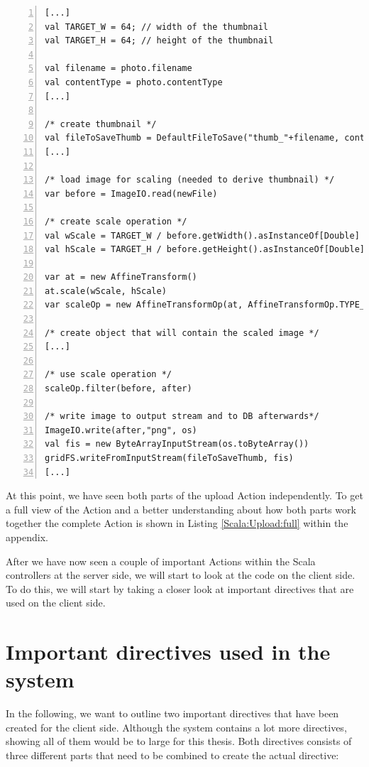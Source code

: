 \begin{lstlisting}[numbers=left,caption={Snippet of the upload Action of the FileController for creating thumbnails},label=Scala:Upload:Thumb,frame=tlbr,breaklines]
[...]
val TARGET_W = 64; // width of the thumbnail
val TARGET_H = 64; // height of the thumbnail

val filename = photo.filename
val contentType = photo.contentType
[...]

/* create thumbnail */
val fileToSaveThumb = DefaultFileToSave("thumb_"+filename, contentType)
[...]

/* load image for scaling (needed to derive thumbnail) */
var before = ImageIO.read(newFile)

/* create scale operation */
val wScale = TARGET_W / before.getWidth().asInstanceOf[Double]
val hScale = TARGET_H / before.getHeight().asInstanceOf[Double]

var at = new AffineTransform()
at.scale(wScale, hScale)
var scaleOp = new AffineTransformOp(at, AffineTransformOp.TYPE_BILINEAR)

/* create object that will contain the scaled image */
[...]

/* use scale operation */
scaleOp.filter(before, after)

/* write image to output stream and to DB afterwards*/
ImageIO.write(after,"png", os)
val fis = new ByteArrayInputStream(os.toByteArray())
gridFS.writeFromInputStream(fileToSaveThumb, fis)
[...]
\end{lstlisting}

At this point, we have seen both parts of the upload Action independently. To get a full view of the Action and a better understanding about how both parts work together the complete Action is shown in Listing \ref{Scala:Upload:full} within the appendix.

After we have now seen a couple of important Actions within the Scala controllers at the server side, we will start to look at the code on the client side. To do this, we will start by taking a closer look at important directives that are used on the client side. 

\section{Important directives used in the system}
\label{usedDirectives}
In the following, we want to outline two important directives that have been created for the client side. Although the system contains a lot more directives, showing all of them would be to large for this thesis. Both directives consists of three different parts that need to be combined to create the actual directive:

